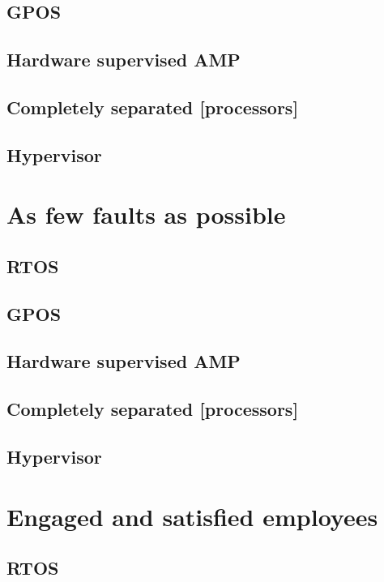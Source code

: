 \subsection{GPOS}
\subsection{Hardware supervised AMP}
\subsection{Completely separated [processors]}
\subsection{Hypervisor}


\section{As few faults as possible}
\subsection{RTOS}
\subsection{GPOS}
\subsection{Hardware supervised AMP}
\subsection{Completely separated [processors]}
\subsection{Hypervisor}


\section{Engaged and satisfied employees}
\subsection{RTOS}
